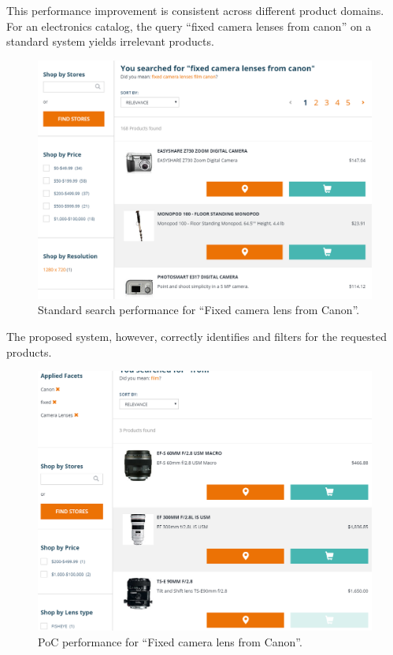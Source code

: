 \documentclass{article}
\begin{document}
    This performance improvement is consistent across different product domains. For an electronics catalog, the query “fixed camera lenses from canon” on a standard system yields irrelevant products.

    \begin{figure}[H]
        \centering
        \includegraphics[width=\columnwidth]{2017-06-25_21h45_27-1.png}
        \caption{Standard search performance for “Fixed camera lens from Canon”.}
        \label{fig:default_electronics}
    \end{figure}

    The proposed system, however, correctly identifies and filters for the requested products.

    \begin{figure}[H]
        \centering
        \includegraphics[width=\columnwidth]{2017-06-25_21h47_181-1.png}
        \caption{PoC performance for “Fixed camera lens from Canon”.}
        \label{fig:poc_electronics}
    \end{figure}
\end{document}
